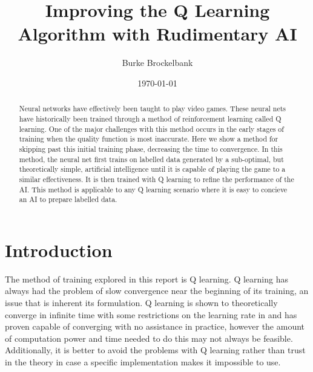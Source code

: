 \documentclass[%
 reprint,
nofootinbib,
 amsmath,amssymb,
 aps,
]{revtex4-1}
\begin{document}

\title{Improving the Q Learning Algorithm with Rudimentary AI}%

\author{Burke Brockelbank}

\date{\today}%

\begin{abstract}
Neural networks have effectively been taught to play video games. These neural nets have historically been trained through a method of reinforcement learning called Q learning. One of the major challenges with this method occurs in the early stages of training when the quality function is most inaccurate. Here we show a method for skipping past this initial training phase, decreasing the time to convergence. In this method, the neural net first trains on labelled data generated by a sub-optimal, but theoretically simple, artificial intelligence until it is capable of playing the game to a similar effectiveness. It is then trained with Q learning to refine the performance of the AI. This method is applicable to any Q learning scenario where it is easy to concieve an AI to prepare labelled data.
\end{abstract}

\maketitle


\section{\label{sec:Introduction}Introduction}
The method of training explored in this report is Q learning. Q learning has always had the problem of slow convergence near the beginning of its training, an issue that is inherent its formulation. Q learning is shown to theoretically converge in infinite time with some restrictions on the learning rate in \cite{sutton1998reinforcement} and has proven capable of converging with no assistance in practice, however the amount of computation power and time needed to do this may not always be feasible. Additionally, it is better to avoid the problems with Q learning rather than trust in the theory in case a specific implementation makes it impossible to use.
\end{document}
